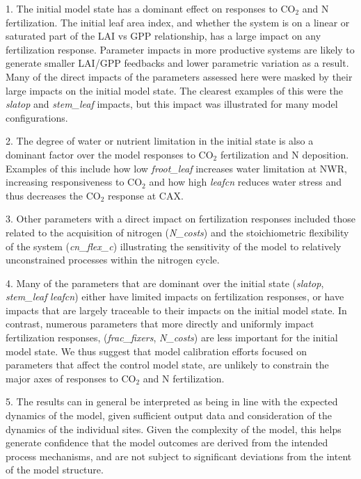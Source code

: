\documentclass[draft,linenumbers]{agujournal}
\begin{document}
1. The initial model state has a dominant effect on  responses to CO$_{2}$ and N fertilization. The initial leaf area index, and whether the system is on a linear or saturated part of the LAI vs GPP relationship, has a large impact on any fertilization response. Parameter impacts in more productive systems are likely to generate smaller LAI/GPP feedbacks and lower parametric variation as a result. Many of the direct impacts of the parameters assessed here were masked by their large impacts on the initial model state.  The clearest examples of this were the \emph{slatop} and \emph{stem\_leaf} impacts, but this impact was illustrated for many model configurations. 

2. The degree of water or nutrient limitation in the initial state is also a dominant factor over the model responses to CO$_{2}$ fertilization and N deposition. Examples of this include how low \emph{froot\_leaf} increases water limitation at NWR, increasing responsiveness to CO$_{2}$ and how high \emph{leafcn} reduces water stress and thus decreases the CO$_{2}$ response at CAX. 

3. Other parameters with a direct impact on fertilization responses included those related to the acquisition of nitrogen (\emph{N\_costs}) and the stoichiometric flexibility of the system (\emph{cn\_flex\_c}) illustrating the sensitivity of the model to relatively unconstrained processes within the nitrogen cycle.   

4. Many of the parameters that are dominant over the initial state (\emph{slatop}, \emph{stem\_leaf} \emph{leafcn}) either have limited impacts on fertilization responses, or have impacts that are largely traceable to their impacts on the initial model state. In contrast, numerous parameters that more directly and uniformly impact fertilization responses, (\emph{frac\_fixers}, \emph{N\_costs}) are less important for the initial model state. We thus suggest that model calibration efforts focused on parameters that affect the control model state, are unlikely to constrain the major axes of responses to CO$_{2}$ and N fertilization. 

5. The results can in general be interpreted as being in line with the expected dynamics of the model, given sufficient output data and consideration of the dynamics of the individual sites. Given the complexity of the model, this helps generate confidence that the model outcomes are derived from the intended process mechanisms, and are not subject to significant deviations from the intent of the model structure.  
\end{document}
